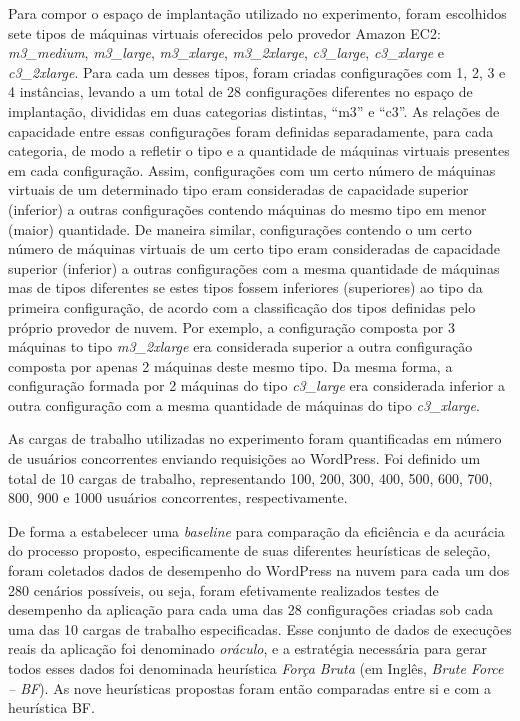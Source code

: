 \documentclass[12pt]{article}
\begin{document}
Para compor o espaço de implantação utilizado no experimento, 
foram escolhidos sete tipos de máquinas virtuais oferecidos pelo provedor Amazon EC2:
{\em m3\_medium}, {\em m3\_large}, {\em m3\_xlarge}, {\em m3\_2xlarge}, {\em c3\_large}, {\em c3\_xlarge} e {\em c3\_2xlarge}. Para cada um desses tipos, foram criadas configurações
com 1, 2, 3 e 4 instâncias, levando a um total de 28 configurações diferentes no espaço de implantação, divididas em duas categorias distintas, ``m3'' e ``c3''. As relações de capacidade entre essas configurações foram definidas separadamente, para cada categoria, de modo a refletir o tipo e a quantidade de máquinas virtuais presentes em cada configuração. Assim, configurações com um certo número de máquinas virtuais de um determinado tipo eram consideradas de capacidade superior (inferior) a outras configurações contendo máquinas do mesmo tipo em menor (maior) quantidade. De maneira similar, configurações contendo o um certo número de máquinas virtuais de um certo tipo eram consideradas de capacidade superior (inferior) a outras configurações com a mesma quantidade de máquinas mas de tipos diferentes se estes tipos fossem inferiores (superiores) ao tipo da primeira configuração, de acordo com a classificação dos tipos definidas pelo próprio provedor de nuvem.  Por exemplo, a configuração composta por 3 máquinas to tipo {\em m3\_2xlarge} era considerada superior a outra configuração composta por apenas 2 máquinas deste mesmo tipo. Da mesma forma, a configuração formada por 2 máquinas do tipo  {\em c3\_large} era considerada inferior a outra configuração com a mesma quantidade de máquinas do tipo {\em c3\_xlarge}.

As cargas de trabalho utilizadas no experimento foram quantificadas em número de usuários concorrentes enviando requisições ao WordPress. Foi definido um total de 10 cargas de trabalho, representando 100, 200, 300, 400, 500, 600, 700, 800, 900 e 1000 usuários concorrentes, respectivamente. 

De forma a estabelecer uma \emph{baseline} para comparação da eficiência e da acurácia do processo proposto, especificamente de suas diferentes heurísticas de seleção, foram coletados dados de desempenho do WordPress na nuvem para cada um dos 280 cenários possíveis, ou seja, foram efetivamente realizados testes de desempenho da aplicação para cada uma das 28 configurações criadas sob cada uma das 10 cargas de trabalho especificadas. Esse conjunto
de dados de execuções reais da aplicação foi denominado {\em oráculo}, e a estratégia necessária para gerar todos esses dados foi denominada heurística {\em Força Bruta} (em Inglês, {\em Brute Force -- BF}). As nove heurísticas propostas foram então comparadas entre si e com a heurística BF.
\end{document}
